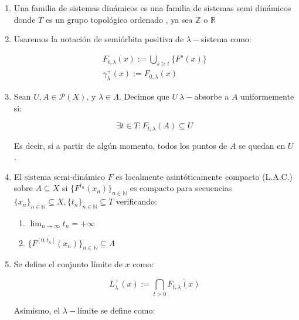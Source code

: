 \begin{defn}
\begin{enumerate}
		es el $\lambda-$sistema semi-dinámico.
		
		Denotaremos a la familia de sistemas semidinámicos por $F_\Lambda$
		
		\item Una familia de sistemas dinámicos es una familia de sistemas semi dinámicos donde $T$ es un grupo topológico ordenado , ya sea $\mathbb{Z}$ o $\mathbb{R}$
		
		\item Usaremos la notación de semiórbita positiva de $\lambda-$sistema como:
		
		\begin{align*}
			F_{t,\lambda}(x) := \bigcup_{s \geq t} \{F^s(x)\} \\
			\gamma_\lambda^+(x) := F_{0,\lambda}(x)  
		\end{align*}
		
		\item Sean $U,A\in \mathcal{P}(X)$, y $\lambda \in \Lambda$. Decimos que $U \ \lambda-$absorbe a $A$ uniformemente si:
		
		\begin{equation*}
			\exists t \in T: F_{t,\lambda} (A) \subseteq U
		\end{equation*}
		
		Es decir, si a partir de algún momento, todos los puntos de $A$ se quedan en $U$.
		
		\item El sistema semi-dinámico $F$ es localmente asintóticamente compacto (L.A.C.) sobre $A\subseteq X$ si $\{F^{t_n}(x_n)\}_{n \in \mathbb{N}}$ es compacto para secuencias$\{x_n\}_{n \in \mathbb{N}} \subseteq X,\{t_n\}_{n \in \mathbb{N}} \subseteq T$ verificando:
		
		\begin{enumerate}
			\item $ \lim_{n\to \infty}t_n = +\infty$
			
			\item $\{F^{[0,t_n]}(x_n)\}_{n \in \mathbb{N}} \subseteq A$
		\end{enumerate} 
		
		\item Se define el conjunto límite de $x$ como:
		
		\begin{equation*}
			L_\lambda^+(x) := \bigcap_{t>0} \overline{F_{t,\lambda}(x)}
		\end{equation*}
		
		Asimismo, el $\lambda-$límite se define como:
		

\end{enumerate}
\end{defn}
